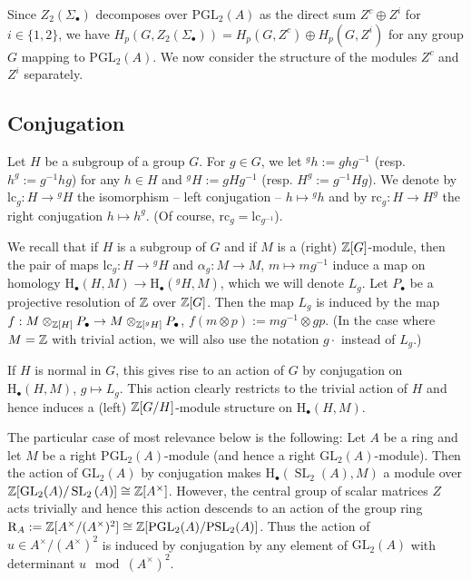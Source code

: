 \documentclass[12pt]{amsart}
\theoremstyle{definition}
\newcommand{\Z}{\Bbb{Z}}
\newcommand{\spl}[2]{\operatorname{SL}_{#1}\left(#2\right)}
\newcommand{\pspl}[2]{\mathrm{PSL}_{#1}(#2)}
\newcommand{\gl}[2]{\mathrm{GL}_{#1}(#2)}
\newcommand{\pgl}[2]{\mathrm{PGL}_{#1}(#2)}
\newcommand{\<}{\langle}
\renewcommand{\>}{\rangle}
\newcommand{\sgr}[1]{\mathrm{R}_{#1}}%
\newcommand{\lconj}[1]{\mathrm{lc}_{#1}}
\newcommand{\rconj}[1]{\mathrm{rc}_{#1}}
\newcommand{\ho}[3]{\mathrm{H}_{#1}\left( #2,#3 \right)}
\begin{document}
Since $Z_2(\Sigma_\bullet)$ decomposes over $\pgl{2}{A}$ as the direct sum $Z^c\oplus Z^i$ for $i\in \{ 1,2\}$, we have $H_p(G,Z_2(\Sigma_\bullet))=H_p(G, Z^c)\oplus H_p(G,Z^i)$ 
for any group $G$ mapping to $\pgl{2}{A}$. We now consider the structure of the modules $Z^c$ and $Z^i$ separately. 
\subsection{Conjugation}\label{sub:conj}
 Let $H$ be a subgroup of a group $G$. For $g\in G$, we let $^gh:=ghg^{-1}$ (resp. $h^g:=g^{-1}hg$) for any $h\in H$ and $^gH:=gHg^{-1}$ (resp. $H^g:=g^{-1}Hg$).
We denote by $\lconj{g}:H\to {}^gH$ the isomorphism -- left conjugation -- $h\mapsto {}^gh$ and by $\rconj{g}:H\to H^g$ the right conjugation $h\mapsto h^g$. (Of course,
$\rconj{g}=\lconj{g^{-1}}$).

We recall that if $H$ is a subgroup of $G$ and if $M$ is a (right) $\Z[G]$-module, then the pair of maps $\lconj{g}:H\to {}^gH$ and $\alpha_g:M\to M$, $m\mapsto mg^{-1}$ induce a map on homology $\ho{\bullet}{H}{M}\to \ho{\bullet}{{}^gH}{M}$, which we will denote $L_g$.  Let $P_\bullet$ be a projective resolution 
of $\Z$ over $\Z[G]$. Then the map $L_g$ is induced by the map $f:M\otimes_{\Z[H]}P_\bullet\to M\otimes_{\Z[{}^gH]}P_\bullet$, $f(m\otimes p):=mg^{-1}\otimes gp$. 
(In the case where $M=\Z$ with trivial action, we will also use the notation $g\cdot$ instead of $L_g$.)

If $H$ is normal in $G$, this gives rise to an action of $G$ by conjugation on $\ho{\bullet}{H}{M}$, $g\mapsto L_g$. This action clearly restricts to the trivial action of $H$ and hence induces a (left) $\Z[G/H]$-module 
structure on $\ho{\bullet}{H}{M}$.

The particular case of most relevance below is the following: Let $A$ be a ring and let $M$ be a right $\pgl{2}{A}$-module (and hence a right $\gl{2}{A}$-module). Then the action of $\gl{2}{A}$ by conjugation makes 
$\ho{\bullet}{\spl{2}{A}}{M}$ a  module over $\Z[\gl{2}{A}/\spl{2}{A}]\cong\Z[A^\times]$. However,  the central group of scalar matrices $Z$ acts trivially and hence this action descends to an action of the group ring $\sgr{A}:=\Z[A^\times/(A^\times)^2]\cong \Z[\pgl{2}{A}/\pspl{2}{A}]$.  Thus the action of $u\in A^\times/(A^\times)^2$ is induced by conjugation by  any element of $\gl{2}{A}$ with determinant $u\mod{(A^\times)^2}$.


\end{document}
